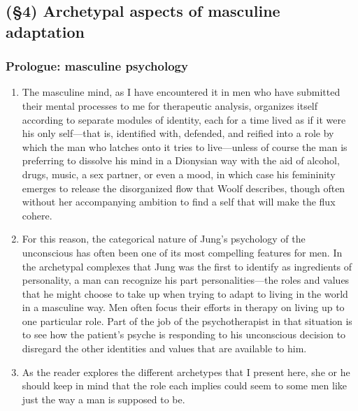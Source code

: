 \subsection{(\S4) Archetypal aspects of masculine adaptation}

\subsubsection{Prologue: masculine psychology}

\begin{enumerate}

\item {} The masculine mind, as I have encountered it
in men who have submitted their mental processes to me for therapeutic
analysis, organizes itself according to separate modules of identity, each for
a time lived as if it were his only self—that is, identified with, defended,
and reified into a role by which the man who latches onto it tries to
live—unless of course the man is preferring to dissolve his mind in a Dionysian
way with the aid of alcohol, drugs, music, a sex partner, or even a mood, in
which case his femininity emerges to release the disorganized flow that Woolf
describes, though often without her accompanying ambition to find a self that
will make the flux cohere.

\item {} For this reason, the
categorical nature of Jung's psychology of the unconscious has often been one
of its most compelling features for men. In the archetypal complexes that Jung
was the first to identify as ingredients of personality, a man can recognize
his part personalities—the roles and values that he might choose to take up
when trying to adapt to living in the world in a masculine way. Men often focus
their efforts in therapy on living up to one particular role. Part of the job
of the psychotherapist in that situation is to see how the patient's psyche is
responding to his unconscious decision to disregard the other identities and
values that are available to him.

\item {} As the reader explores the different
archetypes that I present here, she or he should keep in mind that the role
each implies could seem to some men like just the way a man is supposed to be.

\end{enumerate}


